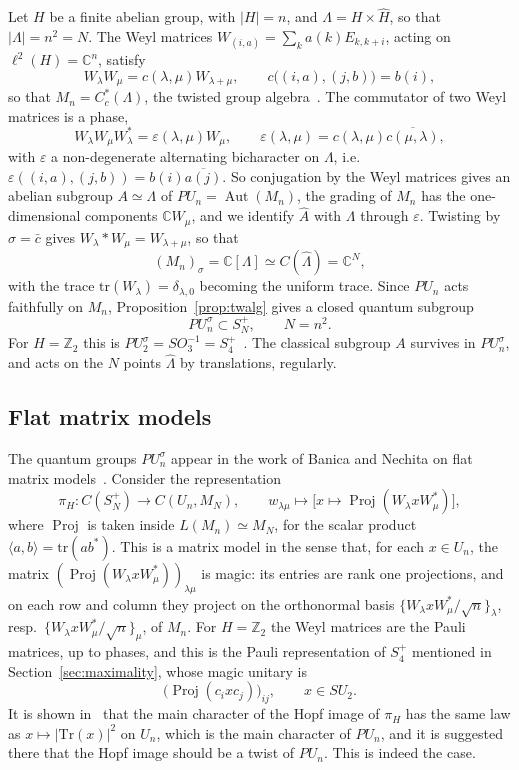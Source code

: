 \documentclass[11pt]{amsart}
\theoremstyle{definition}
\theoremstyle{remark}
\theoremstyle{plain}
\numberwithin{equation}{section}
\numberwithin{table}{section}
\newcommand{\C}{\mathbb C}
\newcommand{\Z}{\mathbb Z}
\DeclareMathOperator{\Aut}{Aut}
\DeclareMathOperator{\Proj}{Proj}
\begin{document}
Let $H$ be a finite abelian group, with $|H|=n$, and $\Lambda=H\times\widehat H$, so that $|\Lambda|=n^2=N$. The Weyl matrices $W_{(i,a)}=\sum_ka(k)E_{k,k+i}$, acting on $\ell^2(H)=\C^n$, satisfy
\[
W_\lambda W_\mu=c(\lambda,\mu)W_{\lambda+\mu},\qquad c\big((i,a),(j,b)\big)=b(i),
\]
so that $M_n=C^*_c(\Lambda)$, the twisted group algebra~\cite[Prop.~2.7]{bn}. The commutator of two Weyl matrices is a phase,
\[
W_\lambda W_\mu W_\lambda^*=\varepsilon(\lambda,\mu)W_\mu,\qquad \varepsilon(\lambda,\mu)=c(\lambda,\mu)\overline{c(\mu,\lambda)},
\]
with $\varepsilon$ a non-degenerate alternating bicharacter on $\Lambda$, i.e.\ $\varepsilon((i,a),(j,b))=b(i)\overline{a(j)}$. So conjugation by the Weyl matrices gives an abelian subgroup $A\simeq\Lambda$ of $PU_n=\Aut(M_n)$, the grading of $M_n$ has the one-dimensional components $\C W_\mu$, and we identify $\widehat A$ with $\Lambda$ through $\varepsilon$. Twisting by $\sigma=\bar c$ gives $W_\lambda*W_\mu=W_{\lambda+\mu}$, so that
\[
(M_n)_\sigma=\C[\Lambda]\simeq C(\widehat\Lambda)=\C^N ,
\]
with the trace $\mathrm{tr}(W_\lambda)=\delta_{\lambda,0}$ becoming the uniform trace. Since $PU_n$ acts faithfully on $M_n$, Proposition~\ref{prop:twalg} gives a closed quantum subgroup
\[
PU_n^\sigma\subset S_N^+ ,\qquad N=n^2 .
\]
For $H=\Z_2$ this is $PU_2^\sigma=SO_3^{-1}=S_4^+$~\cite{bb}. The classical subgroup $A$ survives in $PU_n^\sigma$, and acts on the $N$ points $\widehat\Lambda$ by translations, regularly.

\subsection{Flat matrix models}\label{sec:flat}

The quantum groups $PU_n^\sigma$ appear in the work of Banica and Nechita on flat matrix models~\cite{bn}. Consider the representation
\[
\pi_H:C(S_N^+)\to C(U_n,M_N),\qquad w_{\lambda\mu}\mapsto\big[x\mapsto\Proj(W_\lambda xW_\mu^*)\big],
\]
where $\Proj$ is taken inside $L(M_n)\simeq M_N$, for the scalar product $\langle a,b\rangle=\mathrm{tr}(ab^*)$. This is a matrix model in the sense that, for each $x\in U_n$, the matrix $(\Proj(W_\lambda xW_\mu^*))_{\lambda\mu}$ is magic: its entries are rank one projections, and on each row and column they project on the orthonormal basis $\{W_\lambda xW_\mu^*/\sqrt n\}_\lambda$, resp.\ $\{W_\lambda xW_\mu^*/\sqrt n\}_\mu$, of $M_n$. For $H=\Z_2$ the Weyl matrices are the Pauli matrices, up to phases, and this is the Pauli representation of $S_4^+$ mentioned in Section~\ref{sec:maximality}, whose magic unitary is
\[
\big(\Proj(c_ixc_j)\big)_{ij},\qquad x\in SU_2 .
\] It is shown in~\cite[Thm.~4.3]{bn} that the main character of the Hopf image of $\pi_H$ has the same law as $x\mapsto|\mathrm{Tr}(x)|^2$ on $U_n$, which is the main character of $PU_n$, and it is suggested there that the Hopf image should be a twist of $PU_n$. This is indeed the case.
\end{document}
